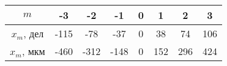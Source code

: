 \begin{tabular}{|c|c|c|c|c|c|c|c|}
\hline
$m$&-3&-2&-1&0&1&2&3\\
\hline
$x_m$, дел&-115&-78&-37&0&38&74&106\\
\hline
$x_m$, мкм&-460&-312&-148&0&152&296&424\\
\hline
\end{tabular}
